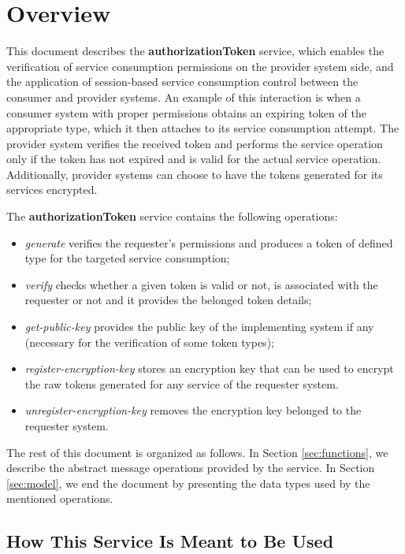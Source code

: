 \documentclass[a4paper]{arrowhead}
\begin{document}
\section{Overview}
\label{sec:overview}
This document describes the \textbf{authorizationToken} service, which enables the verification of service consumption permissions on the provider system side, and the application of session-based service consumption control between the consumer and provider systems. An example of this interaction is when a consumer system with proper permissions obtains an expiring token of the appropriate type, which it then attaches to its service consumption attempt. The provider system verifies the received token and performs the service operation only if the token has not expired and is valid for the actual service operation. Additionally, provider systems can choose to have the tokens generated for its services encrypted.

The \textbf{authorizationToken} service contains the following operations:

\begin{itemize}
    \item \textit{generate} verifies the requester's permissions and produces a token of defined type for the targeted service consumption;
    \item \textit{verify} checks whether a given token is valid or not, is associated with the requester or not and it provides the belonged token details;
    \item \textit{get-public-key} provides the public key of the implementing system if any (necessary for the verification of some token types);
    \item \textit{register-encryption-key} stores an encryption key that can be used to encrypt the raw tokens generated for any service of the requester system.
    \item \textit{unregister-encryption-key} removes the encryption key belonged to the requester system.
\end{itemize}

The rest of this document is organized as follows.
In Section \ref{sec:functions}, we describe the abstract message operations provided by the service.
In Section \ref{sec:model}, we end the document by presenting the data types used by the mentioned operations.

\subsection{How This Service Is Meant to Be Used}
\end{document}
